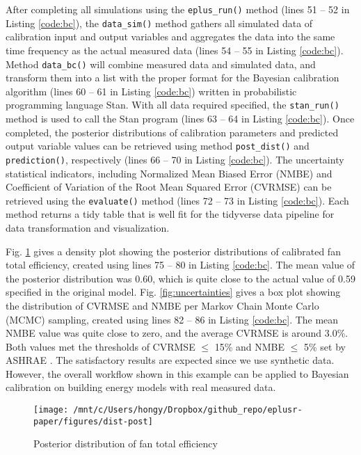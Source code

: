 \documentclass[3p, times]{elsarticle} %
\begin{document}
After completing all simulations using the \texttt{eplus\_run()} method (lines 51 -- 52
in Listing \ref{code:bc}), the \texttt{data\_sim()} method gathers all simulated data of
calibration input and output variables and aggregates the data into the same
time frequency as the actual measured data (lines 54 -- 55 in Listing
\ref{code:bc}).
Method \texttt{data\_bc()} will combine measured data and simulated data, and transform
them into a list with the proper format for the Bayesian calibration algorithm
(lines 60 -- 61 in Listing \ref{code:bc}) written in probabilistic programming
language Stan.
With all data required specified, the \texttt{stan\_run()} method is used to call the
Stan program (lines 63 -- 64 in Listing \ref{code:bc}).
Once completed, the posterior distributions of calibration parameters and
predicted output variable values can be retrieved using method \texttt{post\_dist()}
and \texttt{prediction()}, respectively (lines 66 -- 70 in Listing \ref{code:bc}).
The uncertainty statistical indicators, including Normalized Mean Biased
Error (NMBE) and Coefficient of Variation of the Root Mean Squared Error
(CVRMSE) can be retrieved using the \texttt{evaluate()} method (lines 72 -- 73 in Listing \ref{code:bc}).
Each method returns a tidy table that is well fit for the tidyverse data
pipeline for data transformation and visualization.

Fig. \ref{fig:dist-post} gives a density plot showing the posterior
distributions of calibrated fan total efficiency, created using lines 75 -- 80
in Listing \ref{code:bc}. The mean value of the posterior distribution was
0.60, which is quite close to the actual value of 0.59 specified in the
original model. Fig. \ref{fig:uncertainties} gives a box plot showing the
distribution of CVRMSE and NMBE per Markov Chain Monte Carlo (MCMC) sampling,
created using lines 82 -- 86 in Listing \ref{code:bc}. The mean NMBE value was
quite close to zero, and the average CVRMSE is around 3.0\%. Both values met the
thresholds of CVRMSE \(\leq\) 15\% and NMBE \(\leq\) 5\% set by ASHRAE \citep{ASHRAE2014}.
The satisfactory results are expected since we use synthetic data. However,
the overall workflow shown in this example can be applied to Bayesian
calibration on building energy models with real measured data.

\begin{figure}[!htb]
\texttt{[image: /mnt/c/Users/hongy/Dropbox/github\_repo/eplusr-paper/figures/dist-post]} \caption{Posterior distribution of fan total efficiency}\label{fig:dist-post}
\end{figure}
\end{document}
